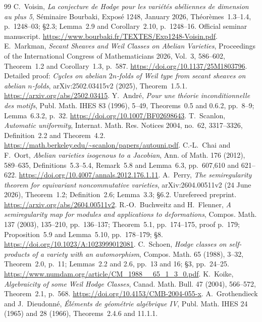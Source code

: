 \documentclass[11pt]{article}
\theoremstyle{definition}
\theoremstyle{remark}
\begin{document}
\begin{thebibliography}{99}
 C.~Voisin, \emph{La conjecture de Hodge pour les vari\'et\'es ab\'eliennes de dimension au plus 5}, S\'eminaire Bourbaki, Expos\'e 1248, January 2026, Th\'eor\`emes~1.3--1.4, p.~1248--03; \S2.3; Lemma~2.9 and Corollary~2.10, p.~1248--16. Official seminar manuscript. \url{https://www.bourbaki.fr/TEXTES/Exp1248-Voisin.pdf}.
 E.~Markman, \emph{Secant Sheaves and Weil Classes on Abelian Varieties}, Proceedings of the International Congress of Mathematicians 2026, Vol.~3, 586--602, Theorem~1.2 and Corollary~1.3, p.~587. \url{https://doi.org/10.1137/25M1803796}. Detailed proof: \emph{Cycles on abelian $2n$-folds of Weil type from secant sheaves on abelian $n$-folds}, arXiv:2502.03415v2 (2025), Theorem~1.5.1. \url{https://arxiv.org/abs/2502.03415}.
 Y.~Andr\'e, \emph{Pour une th\'eorie inconditionnelle des motifs}, Publ. Math. IHES 83 (1996), 5--49, Theorems~0.5 and 0.6.2, pp.~8--9; Lemma~6.3.2, p.~32. \url{https://doi.org/10.1007/BF02698643}.
 T.~Scanlon, \emph{Automatic uniformity}, Internat. Math. Res. Notices 2004, no.~62, 3317--3326, Definition~2.2 and Theorem~4.2. \url{https://math.berkeley.edu/~scanlon/papers/autouni.pdf}.
 C.-L.~Chai and F.~Oort, \emph{Abelian varieties isogenous to a Jacobian}, Ann. of Math. 176 (2012), 589--635, Definitions~5.3--5.4, Remark~5.8 and Lemma~6.3, pp.~607,610 and 621--622. \url{https://doi.org/10.4007/annals.2012.176.1.11}.
 A.~Perry, \emph{The semiregularity theorem for equivariant noncommutative varieties}, arXiv:2604.00511v2 (24 June 2026), Theorem~1.2; Definition~2.6; Lemma~3.3; \S6.2. Unrefereed preprint. \url{https://arxiv.org/abs/2604.00511v2}.
 R.-O.~Buchweitz and H.~Flenner, \emph{A semiregularity map for modules and applications to deformations}, Compos. Math. 137 (2003), 135--210, pp.~136--137; Theorem~5.1, pp.~174--175, proof p.~179; Proposition~5.9 and Lemma~5.10, pp.~178--179; \S8. \url{https://doi.org/10.1023/A:1023999012081}.
 C.~Schoen, \emph{Hodge classes on self-products of a variety with an automorphism}, Compos. Math. 65 (1988), 3--32, Theorem~2.0, p.~11; Lemmas~2.2 and 2.6, pp.~13 and 16; \S3, pp.~24--25. \url{https://www.numdam.org/article/CM_1988__65_1_3_0.pdf}.
 K.~Koike, \emph{Algebraicity of some Weil Hodge Classes}, Canad. Math. Bull. 47 (2004), 566--572, Theorem~2.1, p.~568. \url{https://doi.org/10.4153/CMB-2004-055-x}.
 A.~Grothendieck and J.~Dieudonn\'e, \emph{\'El\'ements de g\'eom\'etrie alg\'ebrique IV}, Publ. Math. IHES 24 (1965) and 28 (1966), Theorems~2.4.6 and 11.1.1.

\end{thebibliography}
\end{document}
